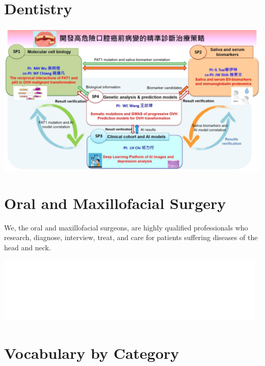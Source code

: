 \documentclass[
paper=landscape,
paper=160mm:90mm, %
fontsize=11pt, %
pagesize, %
parskip=half-, %
]{scrartcl} %
\theoremstyle{mythmstyle} %
\begin{document}
\section{Dentistry}
\includegraphics[width=14cm]{TMU_IRP_Wu_workflow.png}

\section{Oral and Maxillofacial Surgery}

We, the oral and maxillofacial surgeons, are highly qualified professionals who research, diagnose, interview, treat, and care for patients suffering diseases of the head and neck.


\includegraphics[width=13cm]{TAOMS_LOGO.png}

\clearpage
\section{Vocabulary by Category} %
\end{document}
